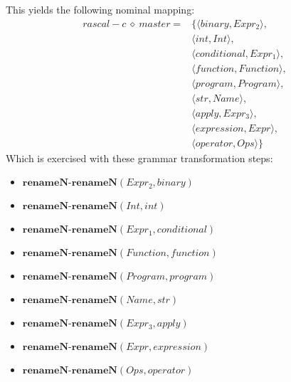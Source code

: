 This yields the following nominal mapping:
\begin{align*}\mathit{rascal-c} \:\diamond\: \mathit{master} =& \{\langle \mathit{binary},\mathit{Expr_2}\rangle,\\
 & \langle int,\mathit{Int}\rangle,\\
 & \langle \mathit{conditional},\mathit{Expr_1}\rangle,\\
 & \langle \mathit{function},\mathit{Function}\rangle,\\
 & \langle \mathit{program},\mathit{Program}\rangle,\\
 & \langle str,\mathit{Name}\rangle,\\
 & \langle \mathit{apply},\mathit{Expr_3}\rangle,\\
 & \langle \mathit{expression},\mathit{Expr}\rangle,\\
 & \langle \mathit{operator},\mathit{Ops}\rangle\}\end{align*}
 Which is exercised with these grammar transformation steps:

{\footnotesize\begin{itemize}
\item $\mathbf{renameN\text{-}renameN}\left(\mathit{Expr_2},\mathit{binary}\right)$
\item $\mathbf{renameN\text{-}renameN}\left(\mathit{Int},int\right)$
\item $\mathbf{renameN\text{-}renameN}\left(\mathit{Expr_1},\mathit{conditional}\right)$
\item $\mathbf{renameN\text{-}renameN}\left(\mathit{Function},\mathit{function}\right)$
\item $\mathbf{renameN\text{-}renameN}\left(\mathit{Program},\mathit{program}\right)$
\item $\mathbf{renameN\text{-}renameN}\left(\mathit{Name},str\right)$
\item $\mathbf{renameN\text{-}renameN}\left(\mathit{Expr_3},\mathit{apply}\right)$
\item $\mathbf{renameN\text{-}renameN}\left(\mathit{Expr},\mathit{expression}\right)$
\item $\mathbf{renameN\text{-}renameN}\left(\mathit{Ops},\mathit{operator}\right)$
\end{itemize}}


